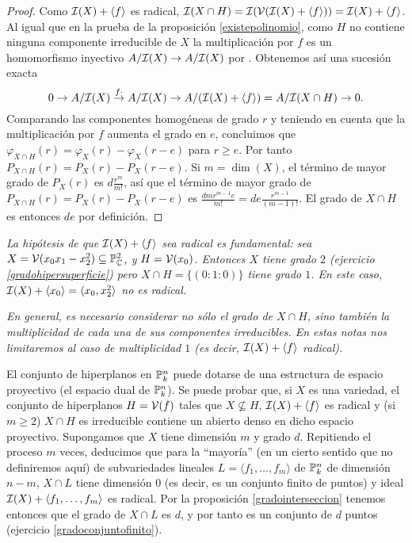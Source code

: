 \documentclass[ACGA.tex]{subfiles}
\begin{document}
\begin{proof}
 Como $\mathcal{I}(X)+\langle f\rangle$ es radical, $\mathcal{I}(X\cap H)=\mathcal{I}(\mathcal{V}(\mathcal{I}(X)+\langle f\rangle))=\mathcal{I}(X)+\langle f\rangle$. Al igual que en la prueba de la proposición \ref{existepolinomio}, como $H$ no contiene ninguna componente irreducible de $X$ la multiplicación por $f$ es un homomorfismo inyectivo $A/\mathcal{I}(X)\to A/\mathcal{I}(X)$ por \cite[Proposición 4.7]{am}. Obtenemos así una sucesión exacta
$$
0\to A/\mathcal{I}(X)\stackrel{f \cdot}{\to} A/\mathcal{I}(X) \to A/(\mathcal{I}(X)+\langle f\rangle)=A/\mathcal{I}(X\cap H)\to 0.
$$
Comparando las componentes homogéneas de grado $r$ y teniendo en cuenta que la multiplicación por $f$ aumenta el grado en $e$, concluimos que $\varphi_{X\cap H}(r)=\varphi_X(r)-\varphi_X(r-e)$ para $r\geq e$. Por tanto $P_{X\cap H}(r)=P_X(r)-P_X(r-e)$. Si $m=\dim(X)$, el término de mayor grado de $P_X(r)$ es $d\frac{r^m}{m!}$, así que el término de mayor grado de $P_{X\cap H}(r)=P_X(r)-P_X(r-e)$ es $\frac{dmr^{m-1}e}{m!}=de\frac{r^{m-1}}{(m-1)!}$. El grado de $X\cap H$ es entonces $de$ por definición. 
\end{proof}

\begin{ejs}
 \emph{La hipótesis de que $\mathcal{I}(X)+\langle f\rangle$ sea radical es fundamental: sea $X=\mathcal{V}(x_0x_1-x_2^2)\subseteq\mathbb{P}^2_{\mathbb{C}}$, y $H=\mathcal{V}(x_0)$. Entonces $X$ tiene grado $2$ (ejercicio \ref{gradohipersuperficie}) pero $X\cap H=\{(0:1:0)\}$ tiene grado $1$. En este caso, $\mathcal{I}(X)+\langle x_0\rangle=\langle x_0,x_2^2\rangle$ no es radical.}

\emph{En general, es necesario considerar no sólo el grado de $X\cap H$, sino también la \emph{multiplicidad} de cada una de sus componentes irreducibles. En estas notas nos limitaremos al caso de multiplicidad $1$ (es decir, $\mathcal{I}(X)+\langle f\rangle$ radical).}
\end{ejs}

El conjunto de hiperplanos en $\mathbb{P}^n_k$ puede dotarse de una estructura de espacio proyectivo (el espacio dual de $\mathbb{P}^n_k$). Se puede probar que, si $X$ es una variedad, el conjunto de hiperplanos $H=\mathcal{V}(f)$ tales que $X\not\subseteq H$, $\mathcal{I}(X)+\langle f\rangle$ es radical y (si $m\geq 2$) $X\cap H$ es irreducible contiene un abierto denso en dicho espacio proyectivo. Supongamos que $X$ tiene dimensión $m$ y grado $d$. Repitiendo el proceso $m$ veces, deducimos que para la ``mayoría'' (en un cierto sentido que no definiremos aquí) de subvariedades lineales $L=\langle f_1,\ldots,f_m\rangle$ de $\mathbb{P}^n_k$ de dimensión $n-m$, $X\cap L$ tiene dimensión $0$ (es decir, es un conjunto finito de puntos) y ideal $\mathcal{I}(X)+\langle f_1,\ldots,f_m\rangle$ es radical. Por la proposición \ref{gradointerseccion} tenemos entonces que el grado de $X\cap L$ es $d$, y por tanto es un conjunto de $d$ puntos (ejercicio \ref{gradoconjuntofinito}).
\end{document}
